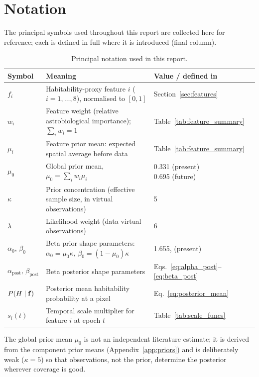\section{Notation}
\label{sec:notation}

The principal symbols used throughout this report are collected here for
reference; each is defined in full where it is introduced (final column).

\begin{table}[H]
\centering
\small
\begin{tabular}{p{2.6cm}p{7.0cm}p{3.4cm}}
\toprule
\textbf{Symbol} & \textbf{Meaning} & \textbf{Value / defined in} \\
\midrule
$f_i$ & Habitability-proxy feature $i$ ($i = 1,\ldots,8$), normalised to $[0,1]$ & Section~\ref{sec:features} \\[2pt]
$w_i$ & Feature weight (relative astrobiological importance); $\sum_i w_i = 1$ & Table~\ref{tab:feature_summary} \\[2pt]
$\mu_i$ & Feature prior mean: expected spatial average before data & Table~\ref{tab:feature_summary} \\[2pt]
$\mu_0$ & Global prior mean, $\mu_0 = \sum_i w_i \mu_i$ & \makecell[tl]{0.331 (present)\\ 0.695 (future)} \\[2pt]
$\kappa$ & Prior concentration (effective sample size, in virtual observations) & 5 \\[2pt]
$\lambda$ & Likelihood weight (data virtual observations) & 6 \\[2pt]
$\alpha_0,\,\beta_0$ & Beta prior shape parameters: $\alpha_0 = \mu_0\kappa$, $\beta_0 = (1-\mu_0)\kappa$ & 1.655,\; 3.345 (present) \\[2pt]
$\alpha_\text{post},\,\beta_\text{post}$ & Beta posterior shape parameters & Eqs.~\ref{eq:alpha_post}--\ref{eq:beta_post} \\[2pt]
$P(H \mid \mathbf{f})$ & Posterior mean habitability probability at a pixel & Eq.~\ref{eq:posterior_mean} \\[2pt]
$s_i(t)$ & Temporal scale multiplier for feature $i$ at epoch $t$ & Table~\ref{tab:scale_funcs} \\
\bottomrule
\end{tabular}
\caption{Principal notation used in this report.}
\label{tab:notation}
\end{table}

The global prior mean $\mu_0$ is not an independent literature estimate; it is
derived from the component prior means (Appendix~\ref{app:priors}) and is
deliberately weak ($\kappa = 5$) so that observations, not the prior, determine
the posterior wherever coverage is good.

